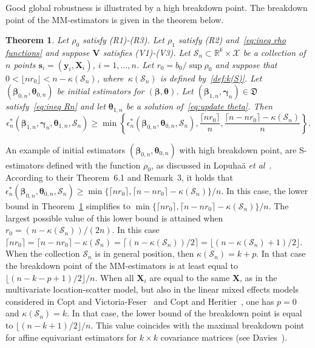\documentclass{article}
\numberwithin{equation}{section}
\theoremstyle{plain}
\newtheorem{theorem}{Theorem}
\newcommand{\R}{\mathbb{R}}
\newcommand{\bbeta}{\bm\beta}
\newcommand{\btheta}{\bm\theta}
\newcommand{\bgamma}{\bm\gamma}
\newcommand{\by}{\mathbf{y}}
\newcommand{\bs}{\mathbf{s}}
\newcommand{\bX}{\mathbf{X}}
\newcommand{\bV}{\mathbf{V}}
\begin{document}
Good global robustness is illustrated by a high breakdown point.
The breakdown point of the MM-estimators is given in the theorem below.
\begin{theorem}
\label{th:bdp}
Let $\rho_0$ satisfy (R1)-(R3).
Let $\rho_1$ satisfy (R2) and~\eqref{eq:ineq rho functions}
and suppose $\bV$ satisfies (V1)-(V3).
Let $\mathcal{S}_n\subset \R^k\times \mathcal{X}$ be a collection of~$n$ points $\bs_i=(\by_i,\bX_i)$,  $i=1,\ldots,n$.
Let $r_0=b_0/\sup\rho_0$ and suppose that $0<\lfloor nr_0\rfloor <n-\kappa(\mathcal{S}_n)$,
where~$\kappa(\mathcal{S}_n)$ is defined by~\eqref{def:k(S)}.
Let $(\bbeta_{0,n},\btheta_{0,n})$ be initial estimators for $(\bbeta,\btheta)$.
Let $(\bbeta_{1,n},\bgamma_n)\in \mathfrak{D}$ satisfy~\eqref{eq:ineq Rn}
and let $\btheta_{1,n}$ be a solution of~\eqref{eq:update theta}.
Then
\[
\epsilon^*_n(\bbeta_{1,n},\bgamma_n,\btheta_{1,n},\mathcal{S}_n)
\geq
\min\left\{
\epsilon^*_n(\bbeta_{0,n},\btheta_{0,n},\mathcal{S}_n),
\frac{\lceil nr_0\rceil}{n},
\frac{\lceil n-nr_0\rceil-\kappa(\mathcal{S}_n)}{n}
\right\}.
\]
\end{theorem}
An example of initial estimators $(\bbeta_{0,n},\btheta_{0,n})$ with high breakdown point,
are S-estimators defined with the function $\rho_0$,
as discussed in Lopuha\"a \emph{et al}~\cite{lopuhaa-gares-ruizgazen2023}.
According to their Theorem~6.1 and Remark~3,
it holds that 
$\epsilon^*_n(\bbeta_{0,n},\btheta_{0,n},\mathcal{S}_n)\geq \min\{\lceil nr_0\rceil,\lceil n-nr_0\rceil-\kappa(\mathcal{S}_n)\}/n$.
In this case, the lower bound in Theorem~\ref{th:bdp} simplifies to
$\min\{\lceil nr_0\rceil,\lceil n-nr_0\rceil-\kappa(\mathcal{S}_n)\}/n$.
The largest possible value of this lower bound is attained when $r_0=(n-\kappa(\mathcal{S}_n))/(2n)$.
In this case 
$\lceil nr_0\rceil=\lceil n-nr_0\rceil-\kappa(\mathcal{S}_n)
=\lceil (n-\kappa(\mathcal{S}_n))/2\rceil
=\lfloor (n-\kappa(\mathcal{S}_n)+1)/2\rfloor$.
When the collection $\mathcal{S}_n$ is in general position, then $\kappa(\mathcal{S}_n)= k+p$.
In that case the breakdown point of the MM-estimators is at least equal
to~$\lfloor (n-k-p+1)/2\rfloor/n$.
When all $\bX_i$ are equal to the same $\bX$, 
as in the multivariate location-scatter model, but 
also in the linear mixed effects models considered in Copt and Victoria-Feser~\cite{copt2006high}
and Copt and Heritier~\cite{copt&heritier2007},
one has $p=0$ and $\kappa(\mathcal{S}_n)=k$.
In that case, the lower bound of the breakdown point is equal to $\lfloor (n-k+1)/2\rfloor/n$.
This value coincides with the maximal breakdown point for affine equivariant estimators
for $k\times k$ covariance matrices (see Davies~\cite[Theorem 6]{davies1987}).
\end{document}
